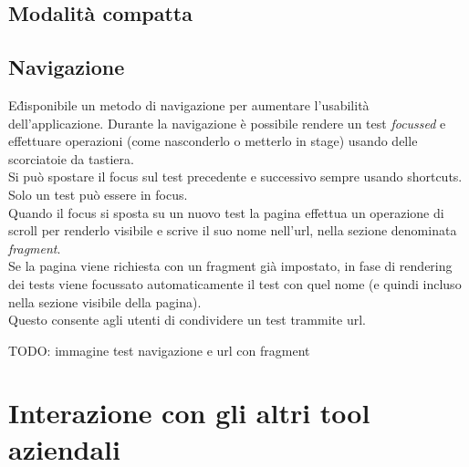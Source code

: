         \subsection{Modalità compatta}
        \subsection{Navigazione}
            E\'  disponibile un metodo di navigazione per aumentare l'usabilità dell'applicazione.
            Durante la navigazione è possibile rendere un test \textit{focussed} e effettuare operazioni (come nasconderlo o metterlo in stage) usando delle scorciatoie da tastiera.\\
            Si può spostare il focus sul test precedente e successivo sempre usando shortcuts.
            Solo un test può essere in focus.\\
            Quando il focus si sposta su un nuovo test la pagina effettua un operazione di scroll per renderlo visibile e scrive il suo nome nell'url, nella sezione denominata \textit{fragment}.\\
            Se la pagina viene richiesta con un fragment già impostato, in fase di rendering dei tests viene focussato automaticamente il test con quel nome (e quindi incluso nella sezione visibile della pagina).\\
            Questo consente agli utenti di condividere un test trammite url.

            TODO: immagine test navigazione e url con fragment
    \section{Interazione con gli altri tool aziendali}